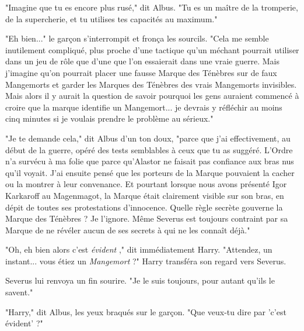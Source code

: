 "Imagine que tu es encore plus rusé," dit Albus. "Tu es un maître de la tromperie, de la supercherie, et tu utilises tes capacités au maximum."

"Eh bien..." le garçon s'interrompit et fronça les sourcils. "Cela me semble inutilement compliqué, plus proche d'une tactique qu'un méchant pourrait utiliser dans un jeu de rôle que d'une que l'on essaierait dans une vraie guerre. Mais j'imagine qu'on pourrait placer une fausse Marque des Ténèbres sur de faux Mangemorts et garder les Marques des Ténèbres des vrais Mangemorts invisibles. Mais alors il y aurait la question de savoir pourquoi les gens auraient commencé à croire que la marque identifie un Mangemort... je devrais y réfléchir au moins cinq minutes si je voulais prendre le problème au sérieux."

"Je te demande cela," dit Albus d'un ton doux, "parce que j'ai effectivement, au début de la guerre, opéré des tests semblables à ceux que tu as suggéré. L'Ordre n'a survécu à ma folie que parce qu'Alastor ne faisait pas confiance aux bras nus qu'il voyait. J'ai ensuite pensé que les porteurs de la Marque pouvaient la cacher ou la montrer à leur convenance. Et pourtant lorsque nous avons présenté Igor Karkaroff au Magenmagot, la Marque était clairement visible sur son bras, en dépit de toutes ses protestations d'innocence. Quelle règle secrète gouverne la Marque des Ténèbres ? Je l'ignore. Même Severus est toujours contraint par sa Marque de ne révéler aucun de ses secrets à qui ne les connaît déjà."

"Oh, eh bien alors c'est \emph{évident} ," dit immédiatement Harry. "Attendez, un instant... vous étiez un \emph{Mangemort}  ?" Harry transféra son regard vers Severus.

Severus lui renvoya un fin sourire. "Je le suis toujours, pour autant qu'ils le savent."

"Harry," dit Albus, les yeux braqués sur le garçon. "Que veux-tu dire par 'c'est évident' ?"

